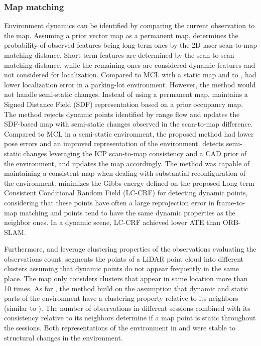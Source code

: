 \subsubsection{Map matching}

Environment dynamics can be identified by comparing the current observation to the map.
Assuming a prior vector map as a permanent map, \cite{biswas-veloso:2017:005} determines the probability of observed features being long-term ones by the 2D laser scan-to-map matching distance. Short-term features are determined by the scan-to-scan matching distance, while the remaining ones are considered dynamic features and not considered for localization. Compared to MCL with a static map and to \cite{tipaldi-et-al:2013:0278364913502830}, \cite{biswas-veloso:2017:005} had lower localization error in a parking-lot environment. However, the method would not handle semi-static changes.
Instead of using a permanent map, \cite{zhang-et-al:2019:8814347} maintains a Signed Distance Field (SDF) representation based on a prior occupancy map. The method rejects dynamic points identified by range flow and updates the SDF-based map with semi-static changes observed in the scan-to-map difference. Compared to MCL in a semi-static environment, the proposed method had lower pose errors and an improved representation of the environment.
\cite{boniardi-et-al:2019:003} detects semi-static changes leveraging the ICP scan-to-map consistency and a CAD prior of the environment, and updates the map accordingly. The method was capable of maintaining a consistent map when dealing with substantial reconfiguration of the environment.
\cite{du-et-al:2022:3028218} minimizes the Gibbs energy defined on the proposed Long-term Consistent Conditional Random Field (LC-CRF) for detecting dynamic points, considering that these points have often a large reprojection error in frame-to-map matching and points tend to have the same dynamic properties as the neighbor ones. In a dynamic scene, LC-CRF achieved lower ATE than ORB-SLAM.

Furthermore, \cite{pan-et-al:2019:s19194252} and \cite{ding-et-al:2020:2942760} leverage clustering properties of the observations evaluating the observations count.
\cite{pan-et-al:2019:s19194252} segments the points of a LiDAR point cloud into different clusters assuming that dynamic points do not appear frequently in the same place. The map only considers clusters that appear in same location more than 10 times.
As for \cite{ding-et-al:2020:2942760}, the method build on the assumption that dynamic and static parts of the environment have a clustering property relative to its neighbors (similar to \cite{du-et-al:2022:3028218}). The number of observations in different sessions combined with its consistency relative to its neighbors determine if a map point is static throughout the sessions.
Both representations of the environment in \cite{pan-et-al:2019:s19194252} and \cite{ding-et-al:2020:2942760} were stable to structural changes in the environment.

